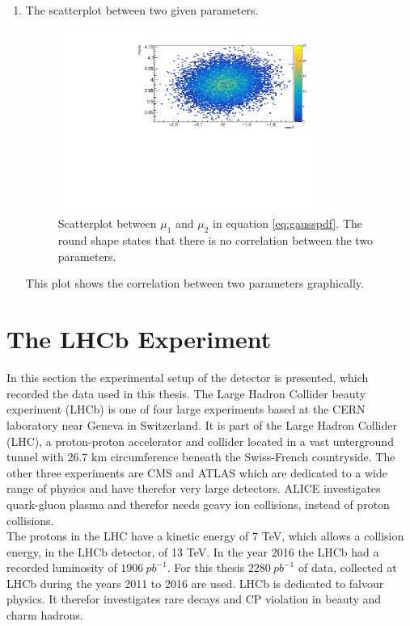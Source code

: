 \documentclass[english]{uzhpub}
\begin{document}
\begin{enumerate}
  \item The scatterplot between two given parameters.
  \begin{figure}[H]
    \centering
    \includegraphics[width=0.8\textwidth]{RooMCMC/scatter}
    \caption{Scatterplot between $\mu_1$ and $\mu_2$ in equation \ref{eq:gausspdf}. The round shape states that there is no correlation between the two parameters.}
    \label{fig:scatter}
  \end{figure}
  This plot shows the correlation between two parameters graphically.
\end{enumerate}




\section{The LHCb Experiment} \label{sec:LHCb}
In this section the experimental setup of the detector is presented, which recorded the data used in this thesis.
The Large Hadron Collider beauty experiment (LHCb) is one of four large experiments based at the CERN laboratory near Geneva in Switzerland. It is part of the Large Hadron Collider (LHC), a proton-proton accelerator and collider located in a vast unterground tunnel with 26.7 km circumference beneath the Swiss-French countryside.
The other three experiments are CMS and ATLAS which are dedicated to a wide range of physics and have therefor very large detectors. ALICE investigates quark-gluon plasma and therefor needs geavy ion collisions, instead of proton collisions. \\
The protons in the LHC have a kinetic energy of 7 TeV, which allows a collision energy, in the LHCb detector, of 13 TeV. In the year 2016 the LHCb had a recorded luminosity of $\SI{1906}{pb^{-1}}$. For this thesis $\SI{2280}{pb^{-1}}$ of data, collected at LHCb during the years 2011 to 2016 are used.
LHCb is dedicated to falvour physics. It therefor investigates rare decays and CP violation in beauty and charm hadrons.
\end{document}
